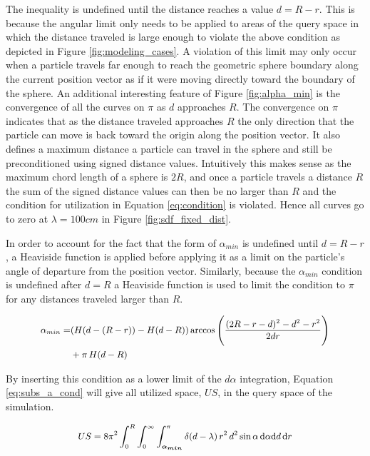 The inequality is undefined until the distance reaches a value $d = R- r$. This
is because the angular limit only needs to be applied to areas of the query
space in which the distance traveled is large enough to violate the above
condition as depicted in  Figure \ref{fig:modeling_cases}. A violation of this
limit may only occur when a particle travels far enough to reach the geometric
sphere boundary along the current position vector as if it were moving directly
toward the boundary of the sphere. An additional interesting feature of Figure
\ref{fig:alpha_min} is the convergence of all the curves on $\pi$ as $d$
approaches $R$. The convergence on $\pi$ indicates that as the distance traveled
approaches $R$ the only direction that the particle can move is back toward the
origin along the position vector. It also defines a maximum distance a particle
can travel in the sphere and still be preconditioned using signed distance
values. Intuitively this makes sense as the maximum chord length of a sphere is
$2R$, and once a particle travels a distance $R$ the sum of the signed distance
values can then be no larger than $R$ and the condition for utilization in
Equation \ref{eq:condition} is violated. Hence all curves go to zero at $\lambda =
100 cm$ in  Figure \ref{fig:sdf_fixed_dist}.

In order to account for the fact that the form of $\alpha_{min}$ is undefined
until $d = R-r$, a Heaviside function is applied before applying it as a limit
on the particle's angle of departure from the position vector. Similarly,
because the $\alpha_{min}$ condition is undefined after $d=R$ a Heaviside
function is used to limit the condition to $\pi$ for any distances traveled
larger than $R$.

\begin{equation}
  \small
  \begin{split}
  \alpha_{min} =& (H(d-(R-r))-H(d-R)) \arccos\Bigg ( \frac{(2R-r-d)^2-d^2-r^2}{2 d r} \Bigg ) \\
  &+ \pi \, H(d-R)
  \end{split}
\end{equation}


By inserting this condition as a lower limit of the $d\alpha$ integration,
Equation \ref{eq:subs_a_cond} will give all utilized space, $US$, in the query space
of the simulation.

\begin{equation}
\small US = 8\pi^2  \int_{0}^{R}\int_{0}^{\infty}\int_{\boldsymbol{\alpha_{min}}}^{\pi} \delta(d-\lambda) \,
r^2 \, d^2 \sin{\alpha} \, \mathrm{d}\alpha \mathrm{d}d \, \mathrm{d}r
\label{eq:subs_a_cond}
\end{equation}

